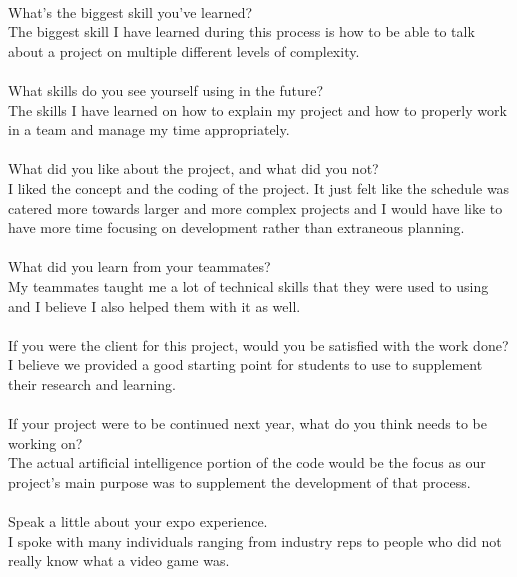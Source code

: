 \\
What's the biggest skill you've learned?\\
The biggest skill I have learned during this process is how to be able to talk about a project on multiple different levels of complexity.\\
\\
What skills do you see yourself using in the future?\\
The skills I have learned on how to explain my project and how to properly work in a team and manage my time appropriately.\\
\\
What did you like about the project, and what did you not?\\
I liked the concept and the coding of the project. It just felt like the schedule was catered more towards larger and more complex projects and I would have like to have more time focusing on development rather than extraneous planning.\\
\\
What did you learn from your teammates?\\
My teammates taught me a lot of technical skills that they were used to using and I believe I also helped them with it as well.\\
\\
If you were the client for this project, would you be satisfied with the work done?\\
I believe we provided a good starting point for students to use to supplement their research and learning.\\
\\
If your project were to be continued next year, what do you think needs to be working on?\\
The actual artificial intelligence portion of the code would be the focus as our project's main purpose was to supplement the development of that process.\\
\\
Speak a little about your expo experience.\\
I spoke with many individuals ranging from industry reps to people who did not really know what a video game was.\\